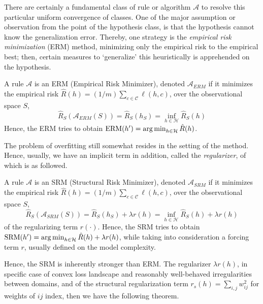 There are certainly a fundamental class of rule or algorithm $\mathcal{A}$ to resolve this particular uniform convergence of classes. One of the major assumption or observation from the point of the hypothesis class, is that the hypothesis cannot know the generalization error. Thereby, one strategy is the \textit{empirical risk minimization} (ERM) method, minimizing only the empirical risk to the empirical best; then, certain measures to `generalize' this heuristically is apprehended on the hypothesis. 

\begin{definition}
    A rule $\mathcal{A}$ is an ERM (Empirical Risk Minimizer), denoted $\mathcal{A}_{ERM}$ if it minimizes the empirical risk $\hat{R}(h)=(1/m)\sum_{c\in\mathcal{C}}\ell(h,c)$, over the observational space $S$, 
    \begin{equation}
        \hat{R}_{S}(\mathcal{A}_{ERM}(S)) = \hat{R}_{S} (h_{S}) = \inf_{h\in\mathcal{H}} \hat{R}_{S}(h) 
    \end{equation}
    Hence, the ERM tries to obtain $\mathrm{ERM}(h') = \operatorname*{arg\,min}_{h\in \mathcal{H}} \hat{R}(h)$. 
\end{definition}

The problem of overfitting still somewhat resides in the setting of the method. Hence, usually, we have an implicit term in addition, called the \textit{regularizer}, of which is as followed. 

\begin{definition}
    A rule $\mathcal{A}$ is an SRM (Structural Risk Minimizer), denoted $\mathcal{A}_{SRM}$ if it minimizes the empirical risk $\hat{R}(h)=(1/m)\sum_{c\in\mathcal{C}}\ell(h,c)$, over the observational space $S$, 
    \begin{equation}
        \hat{R}_{S}(\mathcal{A}_{SRM}(S)) = \hat{R}_{S} (h_{S}) + \lambda r(h)= \inf_{h\in\mathcal{H}} \hat{R}_{S}(h) + \lambda r(h)
    \end{equation}
    of the regularizing term $r(\cdot)$. Hence, the SRM tries to obtain $\mathrm{SRM}(h') = \operatorname*{arg\,min}_{h\in \mathcal{H}} \hat{R}(h)+\lambda r(h)$, while taking into consideration a forcing term $r$, usually defined on the model complexity. 
\end{definition}

Hence, the SRM is inherently stronger than ERM. The regularizer $\lambda r(h)$, in specific case of convex loss landscape and reasonably well-behaved irregularities between domains, and of the structural regularization term $r_{s}(h)=\sum_{i,j}w_{ij}^{2}$ for weights of $ij$ index, then we have the following theorem. 

